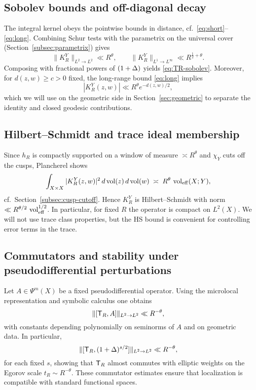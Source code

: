 \subsection{Sobolev bounds and off-diagonal decay}\label{subsec:proj-soboff}
The integral kernel obeys the pointwise bounds in distance, cf.\ \eqref{eq:short}–\eqref{eq:long}.
Combining Schur tests with the parametrix on the universal cover (Section~\ref{subsec:parametrix}) gives
\[
\|K_R^Y\|_{L^2\to L^2}\ll R^\theta,
\qquad
\|K_R^Y\|_{L^1\to L^\infty}\ll R^{\tfrac12+\theta}.
\]
Composing with fractional powers of $(1+\Delta)$ yields \eqref{eq:TR-sobolev}.
Moreover, for $d(z,w)\ge c>0$ fixed, the long-range bound \eqref{eq:long} implies
\[
|K_R^Y(z,w)|\ll R^\theta e^{-d(z,w)/2},
\]
which we will use on the geometric side in Section~\ref{sec:geometric} to separate the identity and closed geodesic contributions.

\subsection{Hilbert–Schmidt and trace ideal membership}\label{subsec:proj-hs}
Since $h_R$ is compactly supported on a window of measure $\asymp R^\theta$ and $\chi_Y$ cuts off the cusps, Plancherel shows
\[
\int_{X\times X} |K_R^Y(z,w)|^2\,d\operatorname{vol}(z)\,d\operatorname{vol}(w)\;\asymp\; R^\theta\,\operatorname{vol}_{\mathrm{eff}}(X;Y),
\]
cf.\ Section~\ref{subsec:cusp-cutoff}.
Hence $K_R^Y$ is Hilbert–Schmidt with norm $\ll R^{\theta/2}\,\operatorname{vol}_{\mathrm{eff}}^{1/2}$.
In particular, for fixed $R$ the operator is compact on $L^2(X)$.
We will not use trace class properties, but the HS bound is convenient for controlling error terms in the trace.

\subsection{Commutators and stability under pseudodifferential perturbations}\label{subsec:proj-comm}
Let $A\in\Psi^m(X)$ be a fixed pseudodifferential operator.
Using the microlocal representation and symbolic calculus one obtains
\[
\|[\mathsf{T}_R,A]\|_{L^2\to L^2}\ll R^{-\theta},
\]
with constants depending polynomially on seminorms of $A$ and on geometric data.
In particular,
\[
\|[\mathsf{T}_R,(1+\Delta)^{s/2}]\|_{L^2\to L^2}\ll R^{-\theta},
\]
for each fixed $s$, showing that $\mathsf{T}_R$ almost commutes with elliptic weights on the Egorov scale $t_R\sim R^{-\theta}$.
These commutator estimates ensure that localization is compatible with standard functional spaces.

